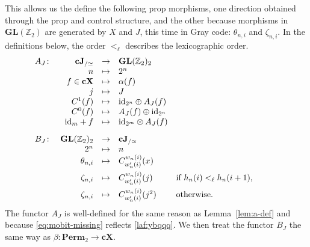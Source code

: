 \documentclass[a4paper]{article}
\theoremstyle{plain}
\theoremstyle{definition}
\newcommand{\cat}[1]{\mathbf{#1}}
\newcommand{\ccat}[1]{\mathbf{c #1}}
\newcommand{\Z}{{\mathbb Z}}
\newcommand{\quo}{_{/\simeq}}
\newcommand{\iid}{\mathrm{id}}
\begin{document}
This allows us the define the following prop morphisms, one direction obtained
through the prop and control structure, and the other because morphisms in
$\cat{GL}(\Z_2)$ are generated by $X$ and $J$, this time in Gray code:
$\theta_{n,i}$ and $\zeta_{n,i}$. In the definitions below, the order $<_\ell$
describes the lexicographic order.
\[
	\begin{array}{lrcllrcll}
		A_J \colon & \ccat J\quo & \to & \cat{GL}(\Z_2)_2& \\
		& n & \mapsto & 2^n & \\
		& f \in \ccat X & \mapsto & \alpha(f) & \\
		& j & \mapsto & J & \\
		& C^1(f) & \mapsto & \iid_{2^n} \oplus A_J(f) & \\
		& C^0(f) & \mapsto & A_J(f) \oplus \iid_{2^n} & \\
		& \iid_m + f & \mapsto & \iid_{2^m} \otimes A_J(f) &&&& \\[2ex]
		B_J \colon & \cat{GL}(\Z_2)_2 & \to & \ccat J\quo \\
		& 2^n & \mapsto & n \\
		& \theta_{n,i} & \mapsto & C^{w_n(i)}_{w'_n(i)}(x) \\[1.4ex]
		& \zeta_{n,i} & \mapsto & C^{w_n(i)}_{w'_n(i)}(j) & \text{if } h_n(i) <_\ell h_n(i+1) \text, \\[1.4ex]
		& \zeta_{n,i} & \mapsto & C^{w_n(i)}_{w'_n(i)}(j^2) & \text{otherwise.}
	\end{array}
\]
The functor $A_J$ is well-defined for the same reason as Lemma~\ref{lem:a-def}
and because \eqref{eq:mobit-missing} reflects \eqref{laf:ybqqq}. We then treat
the functor $B_J$ the same way as $\beta \colon \cat{Perm}_2 \to \ccat X$.
\end{document}
